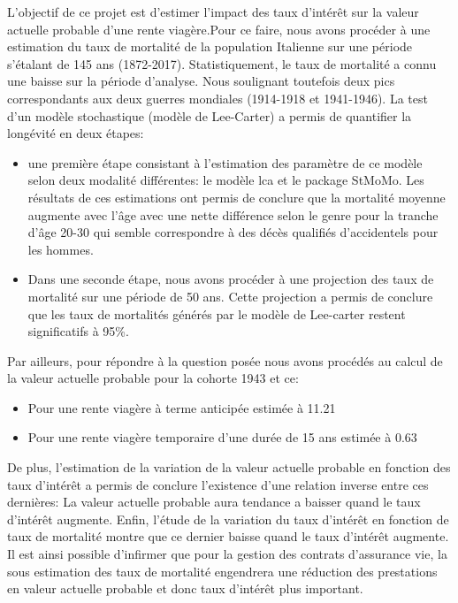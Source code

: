 \documentclass[french]{report}
\begin{document}
L'objectif de ce projet est  d'estimer  l'impact des taux d'intérêt sur la valeur actuelle probable d'une rente viagère.Pour ce faire, nous avons procéder à une estimation du taux de mortalité de la population Italienne  sur une période s'étalant de 145 ans (1872-2017).
\vskip 0.1in
Statistiquement, le taux de mortalité a connu une baisse sur la période d'analyse. Nous soulignant toutefois deux pics correspondants aux deux guerres mondiales (1914-1918 et 1941-1946).
\vskip 0.1in
La test d'un modèle stochastique (modèle de Lee-Carter) a permis de quantifier la longévité en deux étapes:
\begin{itemize}
\vskip 0.1in
    \item une première étape consistant à l'estimation des paramètre de ce modèle selon deux modalité différentes: le modèle lca et le package StMoMo. Les résultats de ces estimations ont permis de conclure que la mortalité moyenne augmente avec l'âge avec une nette différence selon le genre pour la tranche d'âge 20-30 qui semble correspondre à des décès qualifiés d'accidentels pour les hommes.
    \vskip 0.1in
    \item Dans une seconde étape, nous avons procéder à une projection des taux de mortalité sur une période de 50 ans. Cette projection a permis de conclure que les taux de mortalités générés par le modèle de Lee-carter restent significatifs à 95\%.
\end{itemize}
\vskip 0.1in
Par ailleurs, pour répondre à la question posée nous avons procédés au calcul de la valeur actuelle probable pour la cohorte 1943 et ce:
\vskip 0.1in
\begin{itemize}
    \item Pour une rente viagère à terme anticipée estimée à 11.21
    \vskip 0.1in
    \item Pour une rente viagère temporaire d'une durée de 15 ans estimée à 0.63
\end{itemize}
\vskip 0.1in
De plus, l'estimation de la variation de la valeur actuelle probable en fonction des taux d'intérêt a permis de conclure l'existence d'une relation inverse entre ces dernières: La valeur actuelle probable aura tendance a baisser quand le taux d'intérêt augmente.
\vskip 0.1in
Enfin, l'étude de la variation du taux d'intérêt en fonction de taux de mortalité montre que ce dernier baisse quand le taux d'intérêt augmente.
\vskip 0.1in
Il est ainsi possible d'infirmer que pour la gestion des contrats d'assurance vie, la sous estimation des taux de mortalité engendrera une réduction des prestations en valeur actuelle probable et donc taux d'intérêt plus important.
\end{document}
